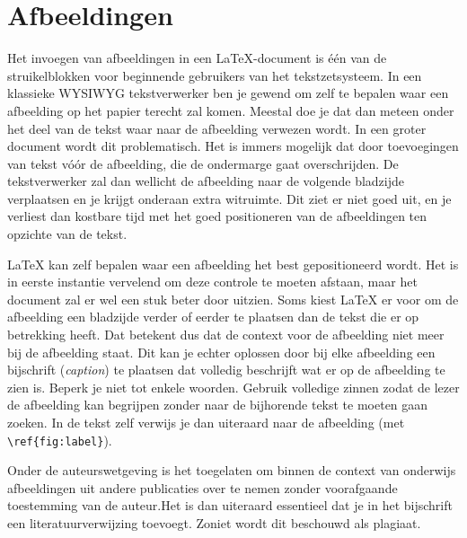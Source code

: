 
%

\section{Afbeeldingen}
\label{sec:afbeeldingen}

Het invoegen van afbeeldingen in een {\LaTeX}-document is \'e\'en van de struikelblokken voor beginnende gebruikers van het tekstzetsysteem. In een klassieke WYSIWYG tekstverwerker ben je gewend om zelf te bepalen waar een afbeelding op het papier terecht zal komen. Meestal doe je dat dan meteen onder het deel van de tekst waar naar de afbeelding verwezen wordt. In een groter document wordt dit problematisch. Het is immers mogelijk dat door toevoegingen van tekst vóór de afbeelding, die de ondermarge gaat overschrijden. De tekstverwerker zal dan wellicht de afbeelding naar de volgende bladzijde verplaatsen en je krijgt onderaan extra witruimte. Dit ziet er niet goed uit, en je verliest dan kostbare tijd met het goed positioneren van de afbeeldingen ten opzichte van de tekst.

{\LaTeX} kan zelf bepalen waar een afbeelding het best gepositioneerd wordt. Het is in eerste instantie vervelend om deze controle te moeten afstaan, maar het document zal er wel een stuk beter door uitzien. Soms kiest {\LaTeX} er voor om de afbeelding een bladzijde verder of eerder te plaatsen dan de tekst die er op betrekking heeft. Dat betekent dus dat de context voor de afbeelding niet meer bij de afbeelding staat. Dit kan je echter oplossen door bij elke afbeelding een bijschrift (\emph{caption}) te plaatsen dat volledig beschrijft wat er op de afbeelding te zien is. Beperk je niet tot enkele woorden. Gebruik volledige zinnen zodat de lezer de afbeelding kan begrijpen zonder naar de bijhorende tekst te moeten gaan zoeken. In de tekst zelf verwijs je dan uiteraard naar de afbeelding (met \verb|\ref{fig:label}|).


Onder de auteurswetgeving is het toegelaten om binnen de context van onderwijs afbeeldingen uit andere publicaties over te nemen zonder voorafgaande toestemming van de auteur.Het is dan uiteraard essentieel dat je in het bijschrift een literatuurverwijzing toevoegt. Zoniet wordt dit beschouwd als plagiaat.

